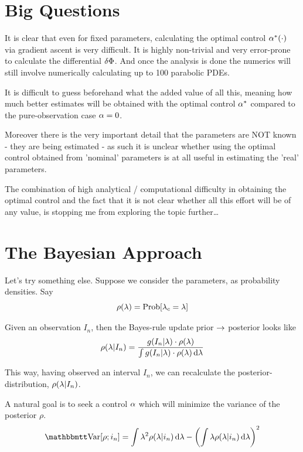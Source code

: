\documentclass{article}
\begin{document}
\section{Big Questions}
It is clear that even for fixed parameters, calculating the optimal control
${\alpha}^*(\cdot)$ via gradient ascent is very difficult. It is highly non-trivial
and very error-prone to calculate the differential $\delta {\Phi}$. And once the analysis is
done the numerics will still involve numerically calculating up to 100 parabolic
PDEs.

It is difficult to guess beforehand what the added value of all this, meaning
how much better estimates will be obtained with the optimal control ${\alpha}^*$
compared to the pure-observation case ${\alpha}=0$. 

Moreover there is the very important detail that the parameters are NOT known -
they are being estimated - as such it is unclear whether using the optimal
control obtained from 'nominal' parameters is at all useful in estimating the
'real' parameters.


The combination of high analytical / computational difficulty in obtaining the
optimal control and the fact that it is not clear whether all this effort will
be of any value, is stopping me from exploring the topic further\ldots


\clearpage

\section{The Bayesian Approach}
Let's try something else. Suppose we consider the parameters, as probability
densities. Say
\begin{equation}
\rho({\lambda}) = \operatorname{Prob} [ { \lambda_{c} } = {\lambda}]
\end{equation}

Given an observation $I_n$, then the Bayes-rule update prior ${\rightarrow}$ posterior
looks like
\begin{equation}
\rho({\lambda} | I_n) = \frac{g(I_n| {\lambda}) \cdot \rho({\lambda})}
					  {\int g(I_n| {\lambda}) \cdot \rho({\lambda}) \, \mathrm{d} {\lambda}}
\end{equation}

This way, having observed an interval $I_n$, we can recalculate the posterior-
distribution, $\rho({\lambda}|I_n)$.

A natural goal is to seek a control ${\alpha}$ which will minimize the variance of the
posterior $\rho$.
$$
\Var[\rho; i_n] = \int \l^2 \rho(\l|i_n) \intd{\l} - \left( \int \l \rho(\l|i_n)
\intd{\l}\right)^2 $$
\end{document}

